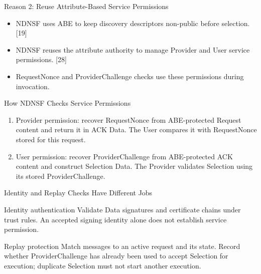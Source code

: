 \begin{frame}{Reason 2: Reuse Attribute-Based Service Permissions}
\begin{itemize}
\item NDNSF uses ABE to keep discovery descriptors non-public before selection. [19]
\item NDNSF reuses the attribute authority to manage Provider and User service permissions. [28]
\item RequestNonce and ProviderChallenge checks use these permissions during invocation.
\end{itemize}
\vspace{3mm}
\end{frame}

\begin{frame}{How NDNSF Checks Service Permissions}
\begin{enumerate}
\item Provider permission: recover RequestNonce from ABE-protected Request content and return it in ACK Data. The User compares it with RequestNonce stored for this request.
\item User permission: recover ProviderChallenge from ABE-protected ACK content and construct Selection Data. The Provider validates Selection using its stored ProviderChallenge.
\end{enumerate}
\vspace{3mm}
\end{frame}

\begin{frame}{Identity and Replay Checks Have Different Jobs}
\begin{block}{Identity authentication}
Validate Data signatures and certificate chains under trust rules. An accepted signing identity alone does not establish service permission.
\end{block}
\begin{block}{Replay protection}
Match messages to an active request and its state. Record whether ProviderChallenge has already been used to accept Selection for execution; duplicate Selection must not start another execution.
\end{block}
\end{frame}

